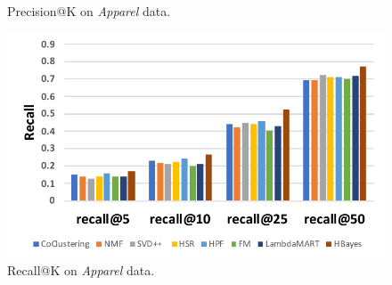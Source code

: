 {\begin{figure}[!htb]
  \caption{Precision@K on \emph{Apparel} data.}
  \label{fig:perf_cmp_precision_apparel}
\endminipage\hfill
{}%
  \includegraphics[width=\linewidth]{fig/recall_jd}
  \caption{Recall@K on \emph{Apparel} data.}
  \label{fig:perf_cmp_recall_apparel}
\endminipage
\end{figure}


}
